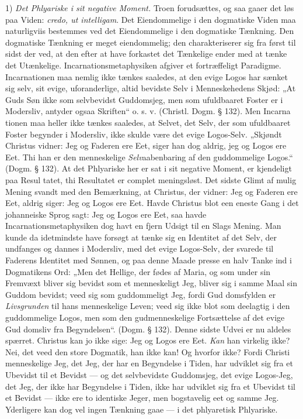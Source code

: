 \documentclass[12pt]{book}
\newcommand{\opage}[1]{\marginnote{\footnotesize\textit{[#1]}}}
\begin{document}
1) \emph{Det Phlyariske i sit negative Moment.}
Troen forudsættes, og saa gaaer det løs paa Viden: \textit{credo,
ut intelligam}. Det Eiendommelige i den dogmatiske Viden
maa naturligviis bestemmes ved det Eiendommelige i den
dogmatiske Tænkning. Den dogmatiske Tænkning er meget
eiendommelig; den charakteriserer sig fra først til sidst der\-%
ved, at den efter at have forkastet det Tænkelige ender med
at tænke det Utænkelige. Incarnationsmetaphysiken afgiver
et fortræffeligt Paradigme. Incarnationen maa nemlig ikke
tænkes saaledes, at den evige Logos har sænket sig selv, sit
evige, uforanderlige, altid bevidste Selv i Menneskehedens
Skjød: „At Guds Søn ikke som selvbevidst Guddomsjeg,
men som ufuldbaaret Foster er i Modersliv, antyder ogsaa
Skriften“ o. s. v. (Christl. Dogm. § 132). Men Incarna\-%
tionen maa heller ikke tænkes saaledes, at Selvet, det Selv,
der som ufuldbaaret Foster begynder i Modersliv, ikke skulde
være det evige Logos-Selv. „Skjøndt Christus vidner: Jeg
og Faderen ere Eet, siger han dog aldrig, jeg og Logos ere
Eet. Thi han er den menneskelige \emph{Selv}aabenbaring af den
guddommelige Logos.“ (Dogm. § 132). At det Phlyariske
her er sat i sit negative Moment, er kjendeligt paa Resul\-%
tatet, thi Resultatet er complet meningsløst. Det sidste Glimt
af mulig Mening svandt med den Bemærkning, at Christus,
der vidner: Jeg og Faderen ere Eet, aldrig siger: Jeg og
Logos ere Eet. Havde Christus blot een eneste Gang i det
johanneiske Sprog sagt: Jeg og Logos ere Eet, saa havde
\opage{92}\setcounter{footnote}{0}%
Incarnationsmetaphysiken dog havt en fjern Udsigt til en
Slags Mening. Man kunde da idetmindste have forsøgt at
tænke sig en Identitet af det Selv, der undfanges og dannes
i Modersliv, med det evige Logos-Selv, der svarede til
Faderens Identitet med Sønnen, og paa denne Maade presse
en halv Tanke ind i Dogmatikens Ord: „Men det Hellige,
der fødes af Maria, og som under sin Fremvæxt bliver sig
bevidst som et menneskeligt Jeg, bliver sig i samme Maal sin
Guddom bevidst; veed sig som guddommeligt Jeg, fordi Gud\-%
domsfylden er \emph{Livsgrunden} til hans menneskelige Leven;
veed sig ikke blot som deelagtig i den guddommelige Logos,
men som den gudmenneskelige Fortsættelse af det evige Gud\-%
domsliv fra Begyndelsen“. (Dogm. § 132). Denne sidste
Udvei er nu aldeles spærret. Christus kan jo ikke sige: Jeg
og Logos ere Eet. \emph{Kan} han virkelig ikke? Nei, det veed
den store Dogmatik, han ikke kan! Og hvorfor ikke? Fordi
Christi menneskelige Jeg, det Jeg, der har en Begyndelse
i Tiden, har udviklet sig fra et Ubevidst til et Bevidst ---
og det selvbevidste Guddomsjeg, det evige Logos-Jeg, det
Jeg, der ikke har Begyndelse i Tiden, ikke har udviklet sig
fra et Ubevidst til et Bevidst --- ikke ere to identiske Jeger,
men bogstavelig eet og samme Jeg. Yderligere kan dog vel
ingen Tænkning gaae --- i det phlyaretisk Phlyariske.
\end{document}
